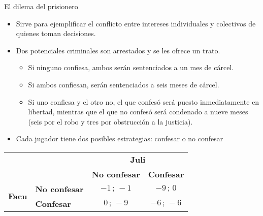 \documentclass{beamer}
\begin{document}
\begin{frame}{El dilema del prisionero}
    \begin{itemize}
    \item Sirve para ejemplificar el conflicto entre intereses individuales y colectivos de quienes toman decisiones. 
        \item Dos potenciales criminales son arrestados y se les ofrece un trato.
        \begin{itemize}
            \item Si ninguno confiesa, ambos serán sentenciados a un mes de cárcel.
            \item Si ambos confiesan, serán sentenciados a seis meses de cárcel.
            \item Si uno confiesa y el otro no, el que confesó será puesto inmediatamente en libertad, mientras que el que no confesó será condenado a nueve meses (seis por el robo y tres por obstrucción a la justicia).
        \end{itemize}
        \item Cada jugador tiene dos posibles estrategias: confesar o no confesar
    \end{itemize}
    \centering
    \setlength{\tabcolsep}{12pt}
    \renewcommand{\arraystretch}{1.4}
    
    \begin{tabular}{@{} l l | c c @{}}
    \multicolumn{2}{c}{} & \multicolumn{2}{c}{\textbf{Juli}} \\
    \multicolumn{2}{c}{} & \textbf{No confesar} & \textbf{Confesar} \\
    \midrule
    \multirow{2}{*}{\textbf{Facu}}
      & \textbf{No confesar} & $-1 \,;\, -1$ & $-9 \,;\, 0$ \\
      & \textbf{Confesar}     & $0 \,;\, -9$  & $-6 \,;\, -6$ \\ \midrule
    \end{tabular}

\end{frame}
\end{document}
